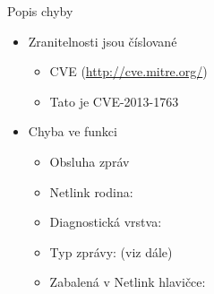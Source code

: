 \begin{frame}{Popis chyby}

  \begin{itemize}
    \item Zranitelnosti jsou číslované
    \begin{itemize}
      \item CVE (\url{http://cve.mitre.org/})
      \item Tato je CVE-2013-1763
    \end{itemize}

    \pause
    \medskip

    \item Chyba ve funkci 
    \begin{itemize}
      \item Obsluha zpráv
      \item Netlink rodina: 

      \pause

      \item Diagnostická vrstva: 

      \pause

      \item Typ zprávy:  (viz dále)
      \item Zabalená v Netlink hlavičce: 
    \end{itemize}

  \end{itemize}

  \medskip
  \pause

  \begin{center}
  \end{center}

\end{frame}

